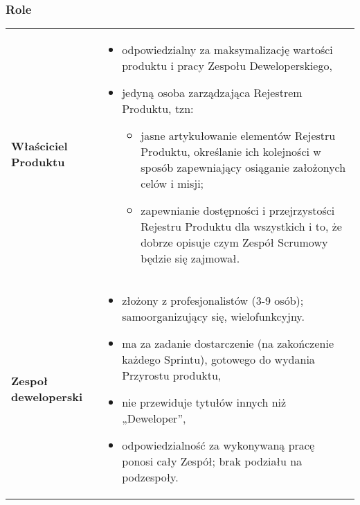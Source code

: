 \documentclass[a4paper]{article}
\begin{document}
    \subsubsection{Role}
    \begin{table}[H]
        \begin{center}
            \begin{tabular}{ p{} p{} }
                \textbf{Właściciel Produktu}
                &
                \begin{itemize}
                    \item odpowiedzialny za maksymalizację wartości produktu i pracy Zespołu
                    Deweloperskiego,
                    \item jedyną osoba zarządzająca Rejestrem Produktu, tzn:
                    \begin{itemize}
                        \item jasne artykułowanie elementów Rejestru Produktu, określanie
                        ich kolejności w sposób zapewniający osiąganie założonych celów i misji;
                        \item zapewnianie dostępności i przejrzystości Rejestru Produktu dla wszystkich i to, że dobrze opisuje czym
                        Zespół Scrumowy będzie się zajmował.
                    \end{itemize}
                \end{itemize}
                \\

                \cmidrule(r){1-1}\cmidrule(l){2-2}
                \textbf{Zespoł deweloperski}
                &
                \begin{itemize}
                    \item złożony z profesjonalistów (3-9 osób); samoorganizujący się, wielofunkcyjny.
                    \item ma za zadanie dostarczenie (na zakończenie
                    każdego Sprintu), gotowego do wydania Przyrostu produktu,
                    \item nie przewiduje tytułów innych niż „Deweloper”,
                    \item odpowiedzialność za wykonywaną pracę ponosi cały Zespół; brak podziału na podzespoły.
                \end{itemize}
                \\


\end{tabular}
\end{center}
\end{table}
\end{document}
